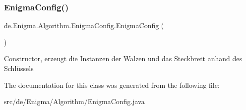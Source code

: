 \subsubsection{\texorpdfstring{Enigma\+Config()}{EnigmaConfig()}}
{\footnotesize\ttfamily de.\+Enigma.\+Algorithm.\+Enigma\+Config.\+Enigma\+Config (\begin{DoxyParamCaption}{ }\end{DoxyParamCaption})}

Constructor, erzeugt die Instanzen der Walzen und das Steckbrett anhand des Schlüssels 

The documentation for this class was generated from the following file\+:\begin{DoxyCompactItemize}
\item 
src/de/\+Enigma/\+Algorithm/Enigma\+Config.\+java\end{DoxyCompactItemize}
